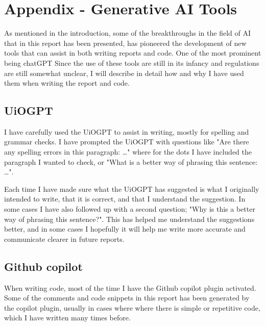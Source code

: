 \documentclass[english,notitlepage,reprint,nofootinbib]{revtex4-1}  %
\begin{document}
\section*{Appendix - Generative AI Tools}


As mentioned in the introduction, some of the breakthroughs in the field
of AI that in this report has been presented, has pioneered the development of
new tools that can assist in both writing reports and code. One of 
the most prominent being chatGPT
Since the use of these tools are still in its infancy and regulations 
are still somewhat unclear, I will describe in detail how and why 
I have used them when writing the report and code.

\subsection{UiOGPT}
I have carefully used the UiOGPT to assist in writing, mostly for spelling
and grammar checks. I have prompted the UiOGPT with 
questions like "Are there any spelling errors in this paragraph: \dots"
where for the dots I have included the paragraph I wanted to check, or
"What is a better way of phrasing this sentence: \dots". 

Each time I have made sure what the UiOGPT has suggested is what I 
originally intended to write, that it is correct, and that I understand the 
suggestion. In some cases I have also followed up with a second
question; "Why is this a better way of phrasing this sentence?". 
This has helped me understand the suggestions better, and in some cases
I hopefully it will help me write more accurate and communicate clearer in
future reports.

\subsection{Github copilot}
When writing code, most of the time I have the Github copilot plugin
activated. Some of the comments and code snippets in this report has been
generated by the copilot plugin, usually in cases where where
there is simple or repetitive code, which I have written many times before.
\end{document}
